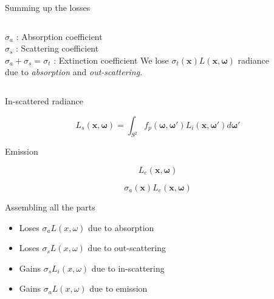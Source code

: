 \documentclass[
  english,            %
  aspectratio=169,    %
]{tumbeamer}
\newcommand\bx[0]{\textbf{x}}
\newcommand\bomega[0]{\boldsymbol{\omega}}
\begin{document}
\begin{frame}{Summing up the losses}
\begin{figure}[ht]
    \centering
    
    \label{fig:interactions}
\end{figure}

\begin{columns}[t, onlytextwidth]
    $\sigma_a$ : Absorption coefficient  \\
    $\sigma_s$ : Scattering coefficient \\
    $\sigma_a + \sigma_s = \sigma_t $ : Extinction coefficient
    We lose 
    $\sigma_t(\bx)L(\bx, \bomega)$
    radiance \\ due to \textit{absorption} and \textit{out-scattering}.
    
\end{columns}
\vspace{3mm}


\end{frame}

\begin{frame}{In-scattered radiance}
\begin{figure}[ht]
    \centering
        
\end{figure}
$$ L_s(\bx, \bomega) = \int_{S^2} f_p(\bomega, \bomega') L_i(\bx, \bomega')
    d\bomega' $$
\end{frame}


\begin{frame}{Emission}
\begin{figure}[ht]
    \centering
        
\end{figure}
$$L_e(\bx, \bomega)$$

$$\sigma_a(\boldsymbol{x})L_e(\bx, \bomega)$$
\end{frame}

\begin{frame}{Assembling all the parts}
    \begin{figure}[ht]
        \centering
        
        \label{fig:interactions}
    \end{figure}
    \begin{itemize}
        \item Loses $\sigma_a L(x, \omega)$ due to absorption
        \item Loses $\sigma_s L(x, \omega)$ due to out-scattering
        \item Gains $\sigma_s L_i(x, \omega)$ due to in-scattering
        \item Gains $\sigma_a L(x, \omega)$ due to emission
    \end{itemize}
\end{frame}
\end{document}
